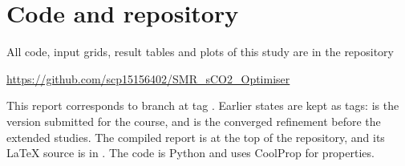 \section{Code and repository}\label{app:code}

All code, input grids, result tables and plots of this study are in the repository
\begin{center}
\url{https://github.com/scp15156402/SMR_sCO2_Optimiser}
\end{center}
This report corresponds to branch  at tag . Earlier states are kept as tags:  is the version submitted for the course, and  is the converged refinement before the extended studies. The compiled report is  at the top of the repository, and its \LaTeX{} source is in . The code is Python and uses CoolProp for properties.

